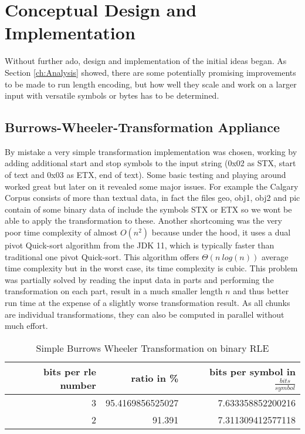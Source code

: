 
\chapter{Conceptual Design and Implementation}
\label{ch:Conceptual Design}
\par{
Without further ado, design and implementation of the initial ideas began. As Section \ref{ch:Analysis} showed, there are some potentially promising improvements to be made to run length encoding, but how well they scale and work on a larger input with versatile symbols or bytes has to be determined.
}

\section{Burrows-Wheeler-Transformation Appliance}
\par{
By mistake a very simple transformation implementation was chosen, working by adding additional start and stop symbols to the input string (0x02 as STX, start of text and 0x03 as ETX, end of text). Some basic testing and playing around worked great but later on it revealed some major issues. For example the Calgary Corpus consists of more than textual data, in fact the files geo, obj1, obj2 and pic contain of some binary data of include the symbols STX or ETX so we wont be able to apply the transformation to these. Another shortcoming was the very poor time complexity of almost $O (n^2)$ because under the hood, it uses a dual pivot Quick-sort algorithm from the JDK 11, which is typically faster than traditional one pivot Quick-sort. This algorithm offers $\Theta (n \: log(n))$ average time complexity but in the worst case, its time complexity is cubic. This problem was partially solved by reading the input data in parts and performing the transformation on each part, result in a much smaller length $n$ and thus better run time at the expense of a slightly worse transformation result. As all chunks are individual transformations, they can also be computed in parallel without much effort.

\begin{table}[h]
	\centering
	\begin{tabular}{r|r|r}	
		bits per rle number & ratio in \% & bits per symbol in $\frac{bits}{symbol}$\\
		\hline
		3 & 95.4169856525027 & 7.633358852200216\\
		2 & 91.391 & 7.311309412577118 \\
	\end{tabular}
	\caption{Simple Burrows Wheeler Transformation on binary RLE}
	\label{tab:t11 Simple Burrows Wheeler Transformation on binary RLE}
\end{table}
}
